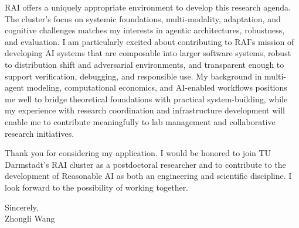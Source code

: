 \documentclass[11pt]{article}
\begin{document}
RAI offers a uniquely appropriate environment to develop this research agenda. 
The cluster's focus on systemic foundations, multi-modality, adaptation, and cognitive challenges matches my interests in agentic architectures, robustness, and evaluation. 
I am particularly excited about contributing to RAI's mission of developing AI systems that are composable into larger software systems, robust to distribution shift and adversarial environments, and transparent enough to support verification, debugging, and responsible use. 
My background in multi-agent modeling, computational economics, and AI-enabled workflows positions me well to bridge theoretical foundations with practical system-building, while my experience with research coordination and infrastructure development will enable me to contribute meaningfully to lab management and collaborative research initiatives.

Thank you for considering my application. I would be honored to join TU Darmstadt's RAI cluster as a postdoctoral researcher and to contribute to the development of Reasonable AI as both an engineering and scientific discipline. 
I look forward to the possibility of working together.

\noindent Sincerely,\\[12mm]
\noindent Zhongli Wang


% 
\end{document}
